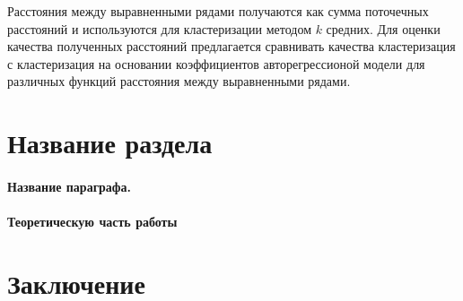 \documentclass[12pt,twoside]{article}
\begin{document}
        Расстояния между выравненными рядами получаются как сумма поточечных расстояний и используются для кластеризации методом $k$\- средних.
        Для оценки качества полученных расстояний предлагается сравнивать качества кластеризация с кластеризация на основании коэффициентов авторегрессионой модели для различных функций расстояния между выравненными рядами.
        

    \section{Название раздела}
    \paragraph{Название параграфа.}
    \paragraph{Теоретическую часть работы}
    \section{Заключение}

     
    
    
    
\end{document}
